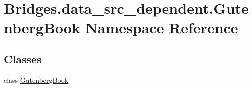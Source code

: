 \hypertarget{namespace_bridges_1_1data__src__dependent_1_1_gutenberg_book}{}\section{Bridges.\+data\+\_\+src\+\_\+dependent.\+Gutenberg\+Book Namespace Reference}
\label{namespace_bridges_1_1data__src__dependent_1_1_gutenberg_book}
\subsection*{Classes}
\begin{DoxyCompactItemize}
\item 
class \hyperlink{class_bridges_1_1data__src__dependent_1_1_gutenberg_book_1_1_gutenberg_book}{Gutenberg\+Book}
\end{DoxyCompactItemize}
